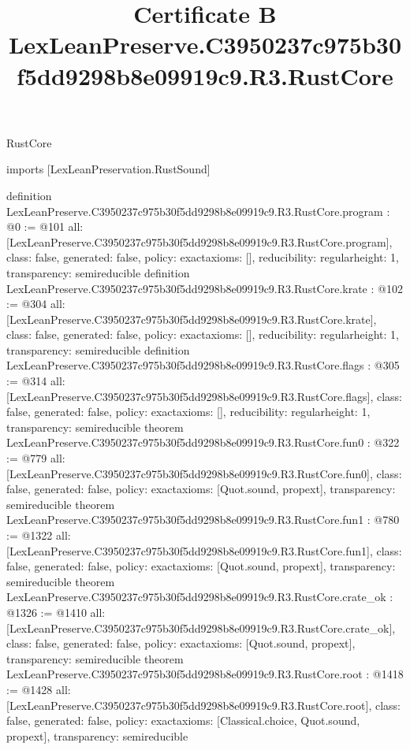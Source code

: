 \begin{lexlean}{RustCore}
\title{Certificate B LexLeanPreserve.C3950237c975b30f5dd9298b8e09919c9.R3.RustCore}
\begin{coremodule}
imports [LexLeanPreservation.RustSound]

definition LexLeanPreserve.C3950237c975b30f5dd9298b8e09919c9.R3.RustCore.program : @0 := @101 {
  all: [LexLeanPreserve.C3950237c975b30f5dd9298b8e09919c9.R3.RustCore.program],
  class: false,
  generated: false,
  policy: exact{axioms: []},
  reducibility: regular{height: 1},
  transparency: semireducible
}
definition LexLeanPreserve.C3950237c975b30f5dd9298b8e09919c9.R3.RustCore.krate : @102 := @304 {
  all: [LexLeanPreserve.C3950237c975b30f5dd9298b8e09919c9.R3.RustCore.krate],
  class: false,
  generated: false,
  policy: exact{axioms: []},
  reducibility: regular{height: 1},
  transparency: semireducible
}
definition LexLeanPreserve.C3950237c975b30f5dd9298b8e09919c9.R3.RustCore.flags : @305 := @314 {
  all: [LexLeanPreserve.C3950237c975b30f5dd9298b8e09919c9.R3.RustCore.flags],
  class: false,
  generated: false,
  policy: exact{axioms: []},
  reducibility: regular{height: 1},
  transparency: semireducible
}
theorem LexLeanPreserve.C3950237c975b30f5dd9298b8e09919c9.R3.RustCore.fun0 : @322 := @779 {
  all: [LexLeanPreserve.C3950237c975b30f5dd9298b8e09919c9.R3.RustCore.fun0],
  class: false,
  generated: false,
  policy: exact{axioms: [Quot.sound, propext]},
  transparency: semireducible
}
theorem LexLeanPreserve.C3950237c975b30f5dd9298b8e09919c9.R3.RustCore.fun1 : @780 := @1322 {
  all: [LexLeanPreserve.C3950237c975b30f5dd9298b8e09919c9.R3.RustCore.fun1],
  class: false,
  generated: false,
  policy: exact{axioms: [Quot.sound, propext]},
  transparency: semireducible
}
theorem LexLeanPreserve.C3950237c975b30f5dd9298b8e09919c9.R3.RustCore.crate_ok : @1326 := @1410 {
  all: [LexLeanPreserve.C3950237c975b30f5dd9298b8e09919c9.R3.RustCore.crate_ok],
  class: false,
  generated: false,
  policy: exact{axioms: [Quot.sound, propext]},
  transparency: semireducible
}
theorem LexLeanPreserve.C3950237c975b30f5dd9298b8e09919c9.R3.RustCore.root : @1418 := @1428 {
  all: [LexLeanPreserve.C3950237c975b30f5dd9298b8e09919c9.R3.RustCore.root],
  class: false,
  generated: false,
  policy: exact{axioms: [Classical.choice, Quot.sound, propext]},
  transparency: semireducible
}


\end{coremodule}
\end{lexlean}
